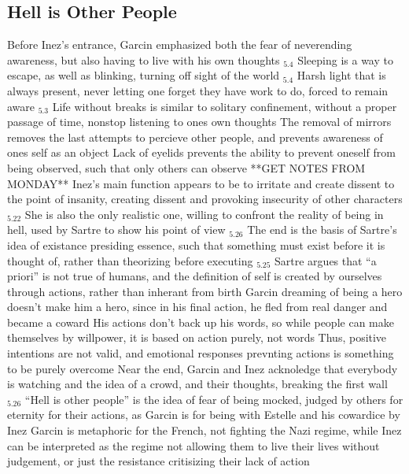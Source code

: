 \documentclass[11 pt, twoside]{article}
\newenvironment{outline*}
{
	\begin{outline}[enumerate]
	}
	{\end{outline}
}
\newcommand{\footb}[2]{\hyperlink{#1}{$_{#1.#2}$}}
\begin{document}
\subsection{Hell is Other People}
\begin{outline*}
\1 Before Inez's entrance, Garcin emphasized both the fear of neverending awareness, but also having to live with his own thoughts \footb{5}{4}
\2 Sleeping is a way to escape, as well as blinking, turning off sight of the world \footb{5}{4}
\2 Harsh light that is always present, never letting one forget they have work to do, forced to remain aware \footb{5}{3}
\1 Life without breaks is similar to solitary confinement, without a proper passage of time, nonstop listening to ones own thoughts
\2 The removal of mirrors removes the last attempts to percieve other people, and prevents awareness of ones self as an object
\2 Lack of eyelids prevents the ability to prevent oneself from being observed, such that only others can observe
\1 **GET NOTES FROM MONDAY** 
\1 Inez's main function appears to be to irritate and create dissent to the point of insanity, creating dissent and provoking insecurity of other characters \footb{5}{22}
\2 She is also the only realistic one, willing to confront the reality of being in hell, used by Sartre to show his point of view  \footb{5}{26}
\1 The end is the basis of Sartre's idea of existance presiding essence, such that something must exist before it is thought of, rather than theorizing before executing \footb{5}{25}
\2 Sartre argues that ``a priori'' is not true of humans, and the definition of self is created by ourselves through actions, rather than inherant from birth
\2 Garcin dreaming of being a hero doesn't make him a hero, since in his final action, he fled from real danger and became a coward
\2 His actions don't back up his words, so while people can make themselves by willpower, it is based on action purely, not words
\2 Thus, positive intentions are not valid, and emotional responses prevnting actions is something to be purely overcome
\1 Near the end, Garcin and Inez acknoledge that everybody is watching and the idea of a crowd, and their thoughts, breaking the first wall \footb{5}{26}
\2 ``Hell is other people'' is the idea of fear of being mocked, judged by others for eternity for their actions, as Garcin is for being with Estelle and his cowardice by Inez
\2 Garcin is metaphoric for the French, not fighting the Nazi regime, while Inez can be interpreted as the regime not allowing them to live their lives without judgement, or just the resistance critisizing their lack of action
\end{outline*}
\end{document}
